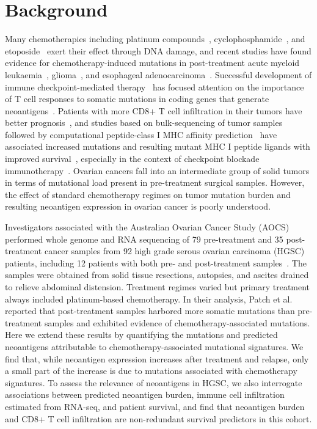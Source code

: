 \documentclass{bmcart}
\begin{document}

\section*{Background}

Many chemotherapies including platinum compounds~\cite{Hannan_1989}, cyclophosphamide~\cite{Anderson_1995}, and etoposide~\cite{NAKANOMYO_1986} exert their effect through DNA damage, and recent studies have found evidence for chemotherapy-induced mutations in post-treatment acute myeloid leukaemia~\cite{Ding_2012}, glioma~\cite{Johnson_2013}, and esophageal adenocarcinoma~\cite{Murugaesu_2015}. Successful development of immune checkpoint-mediated therapy~\cite{Chen_2013} has focused attention on the importance of T cell responses to somatic mutations in coding genes that generate neoantigens~\cite{Schumacher_2015}. Patients with more CD8+ T cell infiltration in their tumors have better prognosis~\cite{Sato2005,Hamanishi2007}, and studies based on bulk-sequencing of tumor samples followed by computational peptide-class I MHC affinity prediction~\cite{Lundegaard_2007} have associated increased mutations and resulting mutant MHC I peptide ligands with improved survival~\cite{Brown_2014}, especially in the context of checkpoint blockade immunotherapy~\cite{Van_Allen_2015,Rizvi_2015}. Ovarian cancers fall into an intermediate group of solid tumors in terms of mutational load present in pre-treatment surgical samples\cite{Lawrence_2013}. However, the effect of standard chemotherapy regimes on tumor mutation burden and resulting neoantigen expression in ovarian cancer is poorly understood.

Investigators associated with the Australian Ovarian Cancer Study (AOCS) performed whole genome and RNA sequencing of 79 pre-treatment and 35 post-treatment cancer samples from 92 high grade serous ovarian carcinoma (HGSC) patients, including 12 patients with both pre- and post-treatment samples~\cite{Patch_2015}. The samples were obtained from solid tissue resections, autopsies, and ascites drained to relieve abdominal distension. Treatment regimes varied but primary treatment always included platinum-based chemotherapy. In their analysis, Patch et al. reported that post-treatment samples harbored more somatic mutations than pre-treatment samples and exhibited evidence of chemotherapy-associated mutations. Here we extend these results by quantifying the mutations and predicted neoantigens attributable to chemotherapy-associated mutational signatures. We find that, while neoantigen expression increases after treatment and relapse, only a small part of the increase is due to mutations associated with chemotherapy signatures. To assess the relevance of neoantigens in HGSC, we also interrogate associations between predicted neoantigen burden, immune cell infiltration estimated from RNA-seq, and patient survival, and find that neoantigen burden and CD8+ T cell infiltration are non-redundant survival predictors in this cohort.
\end{document}
